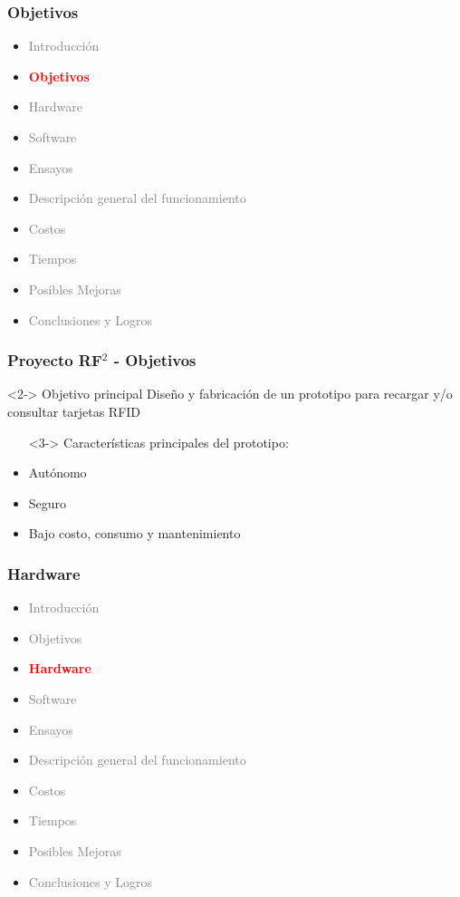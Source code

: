 \documentclass{beamer}
\begin{document}
\begin{frame}
	\frametitle{Objetivos}
	\begin{itemize}
		\item \textcolor{gray}{Introducción}
		\item \textcolor{red}{\bf{Objetivos}}
		\item \textcolor{gray}{Hardware}
		\item \textcolor{gray}{Software}
		\item \textcolor{gray}{Ensayos}
		\item \textcolor{gray}{Descripción general del funcionamiento}		
		\item \textcolor{gray}{Costos}
		\item \textcolor{gray}{Tiempos}
		\item \textcolor{gray}{Posibles Mejoras}
		\item \textcolor{gray}{Conclusiones y Logros}
	\end{itemize}
\end{frame}

\begin{frame}
	\frametitle{Proyecto RF$ ^{2} $ - Objetivos}
		\begin{block}  {Objetivo principal}		
			Diseño y fabricación de un prototipo para recargar y/o consultar tarjetas RFID
		\end{block}

		\bigskip		
		\begin{itemize}			
			\item[] <3-> Características principales del prototipo:

			\bigskip	
			\item <4-> Autónomo

			\bigskip
			\item <4-> Seguro

			\bigskip
			\item <4-> Bajo costo, consumo y mantenimiento
		\end{itemize}

\end{frame}

\begin{frame}
	\frametitle{Hardware}
	\begin{itemize}
		\item \textcolor{gray}{Introducción}
		\item \textcolor{gray}{Objetivos}
		\item \textcolor{red}{\bf{Hardware}}
		\item \textcolor{gray}{Software}
		\item \textcolor{gray}{Ensayos}
		\item \textcolor{gray}{Descripción general del funcionamiento}		
		\item \textcolor{gray}{Costos}
		\item \textcolor{gray}{Tiempos}
		\item \textcolor{gray}{Posibles Mejoras}
		\item \textcolor{gray}{Conclusiones y Logros}
	\end{itemize}
\end{frame}
\end{document}
